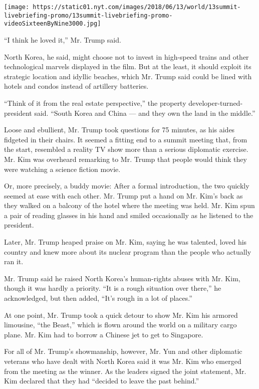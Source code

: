 \texttt{[image: https://static01.nyt.com/images/2018/06/13/world/13summit-livebriefing-promo/13summit-livebriefing-promo-videoSixteenByNine3000.jpg]}

``I think he loved it,'' Mr. Trump said.

North Korea, he said, might choose not to invest in high-speed trains
and other technological marvels displayed in the film. But at the least,
it should exploit its strategic location and idyllic beaches, which Mr.
Trump said could be lined with hotels and condos instead of artillery
batteries.

``Think of it from the real estate perspective,'' the property
developer-turned-president said. ``South Korea and China --- and they
own the land in the middle.''

Loose and ebullient, Mr. Trump took questions for 75 minutes, as his
aides fidgeted in their chairs. It seemed a fitting end to a summit
meeting that, from the start, resembled a reality TV show more than a
serious diplomatic exercise. Mr. Kim was overheard remarking to Mr.
Trump that people would think they were watching a science fiction
movie.

Or, more precisely, a buddy movie: After a formal introduction, the two
quickly seemed at ease with each other. Mr. Trump put a hand on Mr.
Kim's back as they walked on a balcony of the hotel where the meeting
was held. Mr. Kim spun a pair of reading glasses in his hand and smiled
occasionally as he listened to the president.

Later, Mr. Trump heaped praise on Mr. Kim, saying he was talented, loved
his country and knew more about its nuclear program than the people who
actually ran it.

Mr. Trump said he raised North Korea's human-rights abuses with Mr. Kim,
though it was hardly a priority. ``It is a rough situation over there,''
he acknowledged, but then added, ``It's rough in a lot of places.''

At one point, Mr. Trump took a quick detour to show Mr. Kim his armored
limousine, ``the Beast,'' which is flown around the world on a military
cargo plane. Mr. Kim had to borrow a Chinese jet to get to Singapore.

For all of Mr. Trump's showmanship, however, Mr. Yun and other
diplomatic veterans who have dealt with North Korea said it was Mr. Kim
who emerged from the meeting as the winner. As the leaders signed the
joint statement, Mr. Kim declared that they had ``decided to leave the
past behind.''

